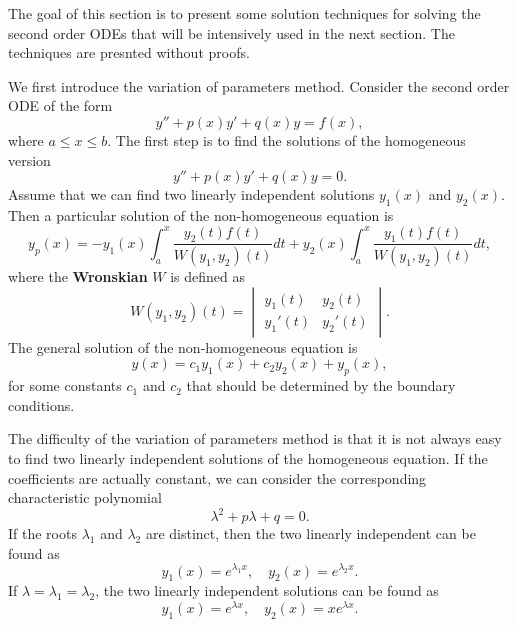 The goal of this section is to present some solution techniques for solving 
the second order ODEs that will be intensively used in the next section. 
The techniques are presnted without proofs. 

We first introduce the variation of parameters method. Consider the 
second order ODE of the form 
\begin{equation*}
    y'' + p(x)y' + q(x)y = f(x),
\end{equation*}
where $a\leq x \leq b$. The first step is to find the solutions of the homogeneous version 
\begin{equation*}
    y'' + p(x)y' + q(x)y = 0.
\end{equation*}
Assume that we can find two linearly independent solutions $y_1(x)$ and $y_2(x)$. 
Then a particular solution of the non-homogeneous equation is 
\begin{equation*}
    y_p(x) = -y_1(x)\int_a^x \frac{y_2(t)f(t)}{W(y_1,y_2)(t)}dt 
    + y_2(x)\int_a^x \frac{y_1(t)f(t)}{W(y_1,y_2)(t)}dt,
\end{equation*}
where the \textbf{Wronskian} $W$ is defined as 
\begin{equation*}
    W(y_1,y_2)(t) = \begin{vmatrix}
        y_1(t) & y_2(t) \\
        y_1'(t) & y_2'(t)
    \end{vmatrix}.
\end{equation*}
The general solution of the non-homogeneous equation is 
\begin{equation*}
    y(x) = c_1y_1(x) + c_2y_2(x) + y_p(x),
\end{equation*}
for some constants $c_1$ and $c_2$ that should be determined by the boundary 
conditions. 

The difficulty of the variation of parameters method is that it is not always easy to find 
two linearly independent solutions of the homogeneous equation. If the coefficients 
are actually constant, we can consider the corresponding characteristic polynomial 
\begin{equation*}
    \lambda^2 + p\lambda + q = 0.
\end{equation*}
If the roots $\lambda_1$ and $\lambda_2$ are distinct, then the two linearly independent 
can be found as 
\begin{equation*}
    y_1(x) = e^{\lambda_1 x}, \quad y_2(x) = e^{\lambda_2 x}.
\end{equation*}
If $\lambda = \lambda_1 = \lambda_2$, the two linearly independent solutions can 
be found as 
\begin{equation*}
    y_1(x) = e^{\lambda x}, \quad y_2(x) = xe^{\lambda x}.
\end{equation*}


